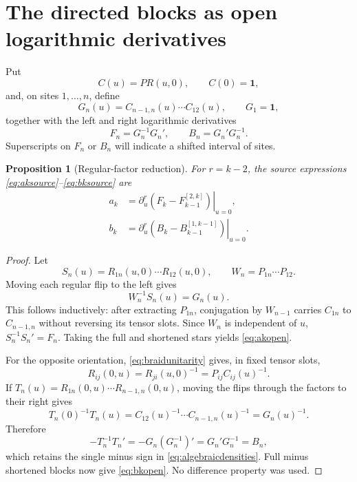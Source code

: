 \documentclass[11pt,a4paper]{article}
\newtheorem{proposition}[theorem]{Proposition}
\theoremstyle{definition}
\theoremstyle{remark}
\begin{document}
\section{The directed blocks as open logarithmic derivatives}

Put
\begin{equation}
 C(u)=P R(u,0),\qquad C(0)=\mathbf 1,
\end{equation}
and, on sites $1,\ldots,n$, define
\begin{equation}
 G_n(u)=C_{n-1,n}(u)\cdots C_{12}(u),\qquad G_1=\mathbf 1,
 \label{eq:Gdef}
\end{equation}
together with the left and right logarithmic derivatives
\begin{equation}
 F_n=G_n^{-1}G_n',\qquad B_n=G_n'G_n^{-1}.
 \label{eq:FBdef}
\end{equation}
Superscripts on $F_n$ or $B_n$ will indicate a shifted interval of sites.

\begin{proposition}[Regular-factor reduction]
\label{prop:starreduction}
For $r=k-2$, the source expressions \eqref{eq:aksource}--\eqref{eq:bksource} are
\begin{align}
 a_k&=\left.\partial_u^r
 \left(F_k-F_{k-1}^{[2,k]}\right)\right|_{u=0},
 \label{eq:akopen}\\
 b_k&=\left.\partial_u^r
 \left(B_k-B_{k-1}^{[1,k-1]}\right)\right|_{u=0}.
 \label{eq:bkopen}
\end{align}
\end{proposition}

\begin{proof}
Let
\begin{equation}
 S_n(u)=R_{1n}(u,0)\cdots R_{12}(u,0),\qquad
 W_n=P_{1n}\cdots P_{12}.
\end{equation}
Moving each regular flip to the left gives
\begin{equation}
 W_n^{-1}S_n(u)=G_n(u).
 \label{eq:leftstar}
\end{equation}
This follows inductively: after extracting $P_{1n}$, conjugation by
$W_{n-1}$ carries $C_{1n}$ to $C_{n-1,n}$ without reversing its tensor slots.
Since $W_n$ is independent of $u$, $S_n^{-1}S_n'=F_n$.  Taking the full and
shortened stars yields \eqref{eq:akopen}.

For the opposite orientation, \eqref{eq:braidunitarity} gives, in fixed tensor slots,
\begin{equation}
 R_{ij}(0,u)=R_{ji}(u,0)^{-1}=P_{ij}C_{ij}(u)^{-1}.
 \label{eq:oppositeR}
\end{equation}
If $T_n(u)=R_{1n}(0,u)\cdots R_{n-1,n}(0,u)$, moving the flips through the
factors to their right gives
\begin{equation}
 T_n(0)^{-1}T_n(u)=
 C_{12}(u)^{-1}\cdots C_{n-1,n}(u)^{-1}=G_n(u)^{-1}.
\end{equation}
Therefore
\begin{equation}
 -T_n^{-1}T_n'=-G_n(G_n^{-1})'=G_n'G_n^{-1}=B_n,
\end{equation}
which retains the single minus sign in \eqref{eq:algebraicdensities}.  Full minus
shortened blocks now give \eqref{eq:bkopen}.  No difference property was used.
\end{proof}
\end{document}
